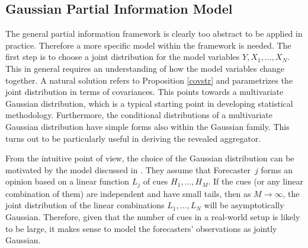 \documentclass[11pt]{article}
\newcommand{\E}{\mathbb{E}}
\theoremstyle{definition}
\theoremstyle{definition}
\def\E{{\mathbb E}}
\begin{document}
\subsection{Gaussian Partial Information Model}
\label{gaussian}
The general partial information framework is clearly too abstract to be applied in practice. Therefore a more specific model within the framework is needed. The first step is to choose a joint distribution for the model variables $Y, X_1, \dots, X_N$. This in general requires an understanding of how the model variables change together. A natural solution refers to Proposition \ref{covstr} and parametrizes the joint distribution in terms of covariances. This points towards a multivariate Gaussian distribution, which is a typical starting point in developing statistical methodology. Furthermore, the conditional distributions of a multivariate Gaussian distribution  have simple forms also within the Gaussian family. This turns out to be particularly useful in deriving the revealed aggregator. 







From the intuitive point of view, the choice of the Gaussian distribution can be motivated by the model discussed in \citet{broomell2009experts}. 
They assume that
Forecaster~$j$ forms an opinion based on a linear function $L_j$ of cues
$H_1 , \ldots , H_M$.
If
the cues (or any linear combination of them) are independent
and have small tails, then as $M \to \infty$, the joint distribution
of the linear combinations $L_1 , \ldots , L_N$ will be asymptotically
Gaussian.  Therefore, given that the number of cues in a real-world setup is likely to be large, it makes sense
to model the forecasters' observations as jointly Gaussian. 
\end{document}

